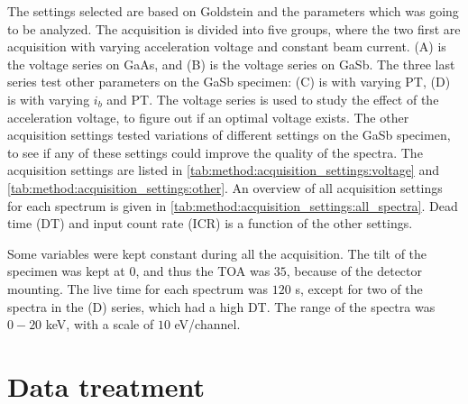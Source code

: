 The settings selected are based on Goldstein \cite{goldstein_scanning_2018} and the parameters which was going to be analyzed.
The acquisition is divided into five groups, where the two first are acquisition with varying acceleration voltage and constant beam current.
(A) is the voltage series on GaAs, and (B) is the voltage series on GaSb.
The three last series test other parameters on the GaSb specimen: (C) is with varying PT, (D) is with varying $i_b$ and PT. %
The voltage series is used to study the effect of the acceleration voltage, to figure out if an optimal voltage exists.
The other acquisition settings tested variations of different settings on the GaSb specimen, to see if any of these settings could improve the quality of the spectra.
The acquisition settings are listed in \cref{tab:method:acquisition_settings:voltage} and \cref{tab:method:acquisition_settings:other}.
An overview of all acquisition settings for each spectrum is given in \cref{tab:method:acquisition_settings:all_spectra}.
Dead time (DT) and input count rate (ICR) is a function of the other settings.


Some variables were kept constant during all the acquisition.
The tilt of the specimen was kept at $0$\textdegree, and thus the TOA was $35$\textdegree, because of the detector mounting.
The live time for each spectrum was $120$ s, except for two of the spectra in the (D) series, which had a high DT.
The range of the spectra was $0-20$ keV, with a scale of $10$ eV/channel.






































\section{Data treatment}
\label{method:data_treatment}

